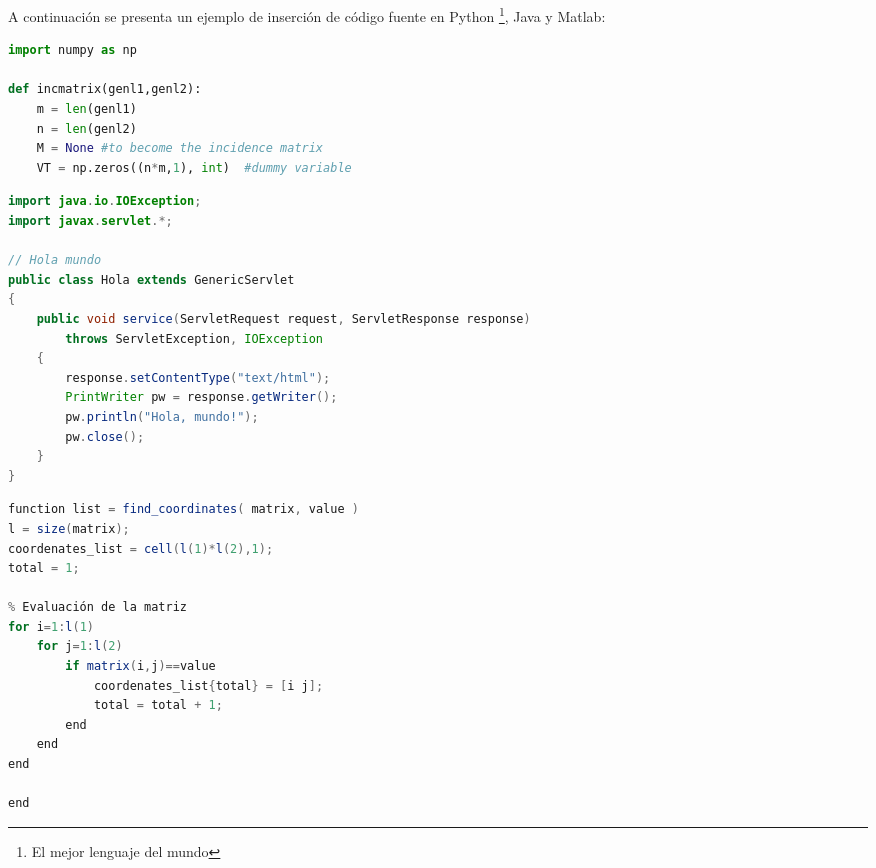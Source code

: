 		\begin{multicols}{2}
		
			\lipsum[114]
			
			\vspace{-0.1cm}
			
			\lipsum[5]
			
		\end{multicols}
		
		\lipsum[1]
		
		
\newpage	



	A continuación se presenta un ejemplo de inserción de código fuente en Python \footnote{El mejor lenguaje del mundo}, Java y Matlab:

\lstset{style=Python}
\begin{lstlisting}[language=Python, caption=Ejemplo en Python]
import numpy as np
 
def incmatrix(genl1,genl2):
    m = len(genl1)
    n = len(genl2)
    M = None #to become the incidence matrix
    VT = np.zeros((n*m,1), int)  #dummy variable
\end{lstlisting}

\lstset{style=Java}
\begin{lstlisting}[language=Java, caption=Ejemplo en Java]
import java.io.IOException; 
import javax.servlet.*;

// Hola mundo
public class Hola extends GenericServlet 
{
    public void service(ServletRequest request, ServletResponse response)
        throws ServletException, IOException
    {
        response.setContentType("text/html");
        PrintWriter pw = response.getWriter();
        pw.println("Hola, mundo!");
        pw.close();
    }
}
\end{lstlisting}

\lstset{style=Matlab}
\begin{lstlisting}[language=Java, caption=Ejemplo en Matlab]
function list = find_coordinates( matrix, value )
l = size(matrix);
coordenates_list = cell(l(1)*l(2),1);
total = 1;

% Evaluación de la matriz
for i=1:l(1)
    for j=1:l(2)
        if matrix(i,j)==value
            coordenates_list{total} = [i j];
            total = total + 1;
        end
    end
end

end
\end{lstlisting}


